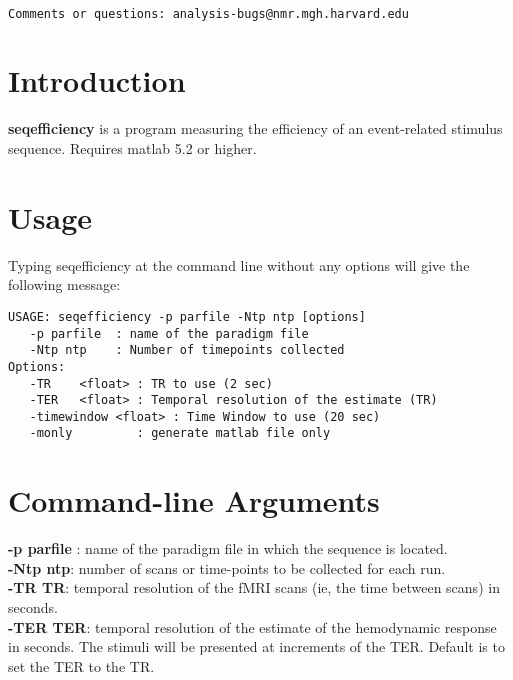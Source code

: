 \documentclass[10pt]{article}
\begin{document}
\begin{Large}
 \\
\end{Large}

\noindent 
\begin{verbatim}
Comments or questions: analysis-bugs@nmr.mgh.harvard.edu
\end{verbatim}

\section{Introduction}
{\bf seqefficiency} is a program measuring the efficiency of an
event-related stimulus sequence. Requires matlab 5.2 or higher.\\

\section{Usage}
Typing seqefficiency at the command line without any options will give the
following message:\\ 

\begin{small}
\begin{verbatim}
USAGE: seqefficiency -p parfile -Ntp ntp [options] 
   -p parfile  : name of the paradigm file
   -Ntp ntp    : Number of timepoints collected
Options:
   -TR    <float> : TR to use (2 sec)
   -TER   <float> : Temporal resolution of the estimate (TR)
   -timewindow <float> : Time Window to use (20 sec)
   -monly         : generate matlab file only
\end{verbatim}
\end{small}

\section{Command-line Arguments}

\noindent
{\bf -p parfile }: name of the paradigm file in which the sequence is
located. \\

\noindent
{\bf -Ntp ntp}: number of scans or time-points to be collected for
each run.\\

\noindent
{\bf -TR TR}: temporal resolution of the fMRI scans (ie, the time
between scans) in seconds.\\

\noindent
{\bf -TER TER}: temporal resolution of the estimate of the hemodynamic
response in seconds. The stimuli will be presented at increments of
the TER.  Default is to set the TER to the TR.\\
\end{document}
